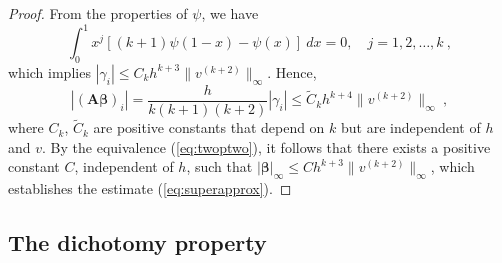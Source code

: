 \documentclass{amsart}
\newcommand{\bA}{\mathbf{A}}
\newcommand{\bbeta}{\boldsymbol{\beta}}
\begin{document}
\begin{proof}
From the properties of $\psi$, we have
$$\int_0^1 x^j\left[(k+1)\psi(1-x)-\psi(x) \right]~dx=0,\quad j=1,2,\dots,k\ ,$$
which implies
$|\gamma_i|\leq C_k h^{k+3}\|v^{(k+2)}\|_\infty$.
Hence,
$$|(\bA\bbeta)_i|=\frac{h}{k(k+1)(k+2)}|\gamma_i|\leq \widetilde{C}_k h^{k+4}\|v^{(k+2)}\|_\infty\ ,$$
where $C_k$, $\widetilde{C}_k$ are positive constants that depend on $k$ but are independent of $h$ and $v$. By the equivalence (\ref{eq:twoptwo}), it follows that there exists a positive constant $C$, independent of $h$, such that $|\bbeta|_\infty \leq C h^{k+3} \|v^{(k+2)}\|_\infty$, which establishes the estimate (\ref{eq:superapprox}).
\end{proof}

\subsection{The dichotomy property}
\end{document}

